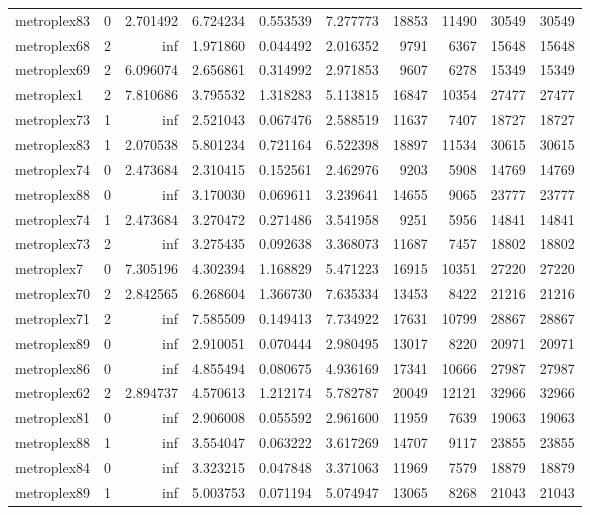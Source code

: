 \begin{longtable}{|l|r|r|r|r|r|r|r|r|r|}
metroplex83 & 0 & 2.701492 & 6.724234 & 0.553539 & 7.277773 & 18853 & 11490 & 30549 & 30549 \\
metroplex68 & 2 & inf & 1.971860 & 0.044492 & 2.016352 & 9791 & 6367 & 15648 & 15648 \\
metroplex69 & 2 & 6.096074 & 2.656861 & 0.314992 & 2.971853 & 9607 & 6278 & 15349 & 15349 \\
metroplex1 & 2 & 7.810686 & 3.795532 & 1.318283 & 5.113815 & 16847 & 10354 & 27477 & 27477 \\
metroplex73 & 1 & inf & 2.521043 & 0.067476 & 2.588519 & 11637 & 7407 & 18727 & 18727 \\
metroplex83 & 1 & 2.070538 & 5.801234 & 0.721164 & 6.522398 & 18897 & 11534 & 30615 & 30615 \\
metroplex74 & 0 & 2.473684 & 2.310415 & 0.152561 & 2.462976 & 9203 & 5908 & 14769 & 14769 \\
metroplex88 & 0 & inf & 3.170030 & 0.069611 & 3.239641 & 14655 & 9065 & 23777 & 23777 \\
metroplex74 & 1 & 2.473684 & 3.270472 & 0.271486 & 3.541958 & 9251 & 5956 & 14841 & 14841 \\
metroplex73 & 2 & inf & 3.275435 & 0.092638 & 3.368073 & 11687 & 7457 & 18802 & 18802 \\
metroplex7 & 0 & 7.305196 & 4.302394 & 1.168829 & 5.471223 & 16915 & 10351 & 27220 & 27220 \\
metroplex70 & 2 & 2.842565 & 6.268604 & 1.366730 & 7.635334 & 13453 & 8422 & 21216 & 21216 \\
metroplex71 & 2 & inf & 7.585509 & 0.149413 & 7.734922 & 17631 & 10799 & 28867 & 28867 \\
metroplex89 & 0 & inf & 2.910051 & 0.070444 & 2.980495 & 13017 & 8220 & 20971 & 20971 \\
metroplex86 & 0 & inf & 4.855494 & 0.080675 & 4.936169 & 17341 & 10666 & 27987 & 27987 \\
metroplex62 & 2 & 2.894737 & 4.570613 & 1.212174 & 5.782787 & 20049 & 12121 & 32966 & 32966 \\
metroplex81 & 0 & inf & 2.906008 & 0.055592 & 2.961600 & 11959 & 7639 & 19063 & 19063 \\
metroplex88 & 1 & inf & 3.554047 & 0.063222 & 3.617269 & 14707 & 9117 & 23855 & 23855 \\
metroplex84 & 0 & inf & 3.323215 & 0.047848 & 3.371063 & 11969 & 7579 & 18879 & 18879 \\
metroplex89 & 1 & inf & 5.003753 & 0.071194 & 5.074947 & 13065 & 8268 & 21043 & 21043 \\

\end{longtable}
